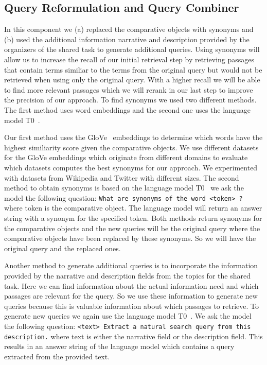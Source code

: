     \subsection{Query Reformulation and Query Combiner} \label{reformulation}
        In this component we (a) replaced the comparative objects with synonyms and (b) used the additional information narrative and description  provided by the organizers of the shared task to generate additional queries. Using synonyms will allow us to increase the recall of our initial retrieval step by retrieving passages that contain terms similiar to the terms from the original query but would not be retrieved when using only the original query. With a higher recall we will be able to find more relevant passages which we will rerank in our last step to improve the precision of our approach. To find synonyms we used two different methods. The first method uses word embeddings and the second one uses the language model T0~\cite{SanhWRBSACSLRDBXTSSKCNDCJWMSYPBWNRSSFFTBGBWR2021}.\par
        Our first method uses the GloVe~\cite{PenningtonSM2014} embeddings to determine which words have the highest similiarity score given the comparative objects. We use different datasets for the GloVe embeddings which originate from different domains to evaluate which datasets computes the best synonyms for our approach. We experimented with datasets from Wikipedia and Twitter with different sizes. The second method to obtain synonyms is based on the language model T0~\cite{SanhWRBSACSLRDBXTSSKCNDCJWMSYPBWNRSSFFTBGBWR2021} we ask the model the following question: \texttt{What are synonyms of the word <token> ?} where token is the comparative object. The language model will return an answer string with a synonym for the specified token. Both methods return synonyms for the comparative objects and the new queries will be the original query where the comparative objects have been replaced by these synonyms. So we will have the original query and the replaced ones.\par
        Another method to generate additional queries is to incorporate the information provided by the narrative and description fields from the topics for the shared task. Here we can find information about the actual information need and which passages are relevant for the query. So we use these information to generate new queries because this is valuable information  about which passages to retrieve. To generate new queries we again use the language model T0~\cite{SanhWRBSACSLRDBXTSSKCNDCJWMSYPBWNRSSFFTBGBWR2021}. We ask the model the following question: \texttt{<text> Extract a natural search query from this description.} where text is either the narrative field or the description field. This results in an answer string of the language model which contains a query extracted  from the provided text.\par
